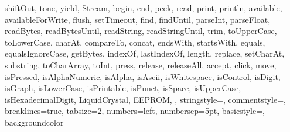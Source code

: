 {{		shiftOut, tone, yield, Stream, begin, end, peek, read, print, 
		println, available, availableForWrite, flush, setTimeout, find, 
		findUntil, parseInt, parseFloat, readBytes, readBytesUntil, readString, 
		readStringUntil, trim, toUpperCase, toLowerCase, charAt, compareTo, 
		concat, endsWith, startsWith, equals, equalsIgnoreCase, getBytes, 
		indexOf, lastIndexOf, length, replace, setCharAt, substring, 
		toCharArray, toInt, press, release, releaseAll, accept, click, move, 
		isPressed, isAlphaNumeric, isAlpha, isAscii, isWhitespace, isControl, 
		isDigit, isGraph, isLowerCase, isPrintable, isPunct, isSpace, 
		isUpperCase, isHexadecimalDigit, 
		LiquidCrystal,
		EEPROM,
	},      
	stringstyle=\color{arduinoDarkBlue},    
	commentstyle=\color{arduinoGrey},    
	breaklines=true,                    %
	tabsize=2,    
	 numbers=left,                    
	numbersep=5pt,        
	basicstyle=\ttfamily ,
	backgroundcolor=\color{backcolour!50}
}
